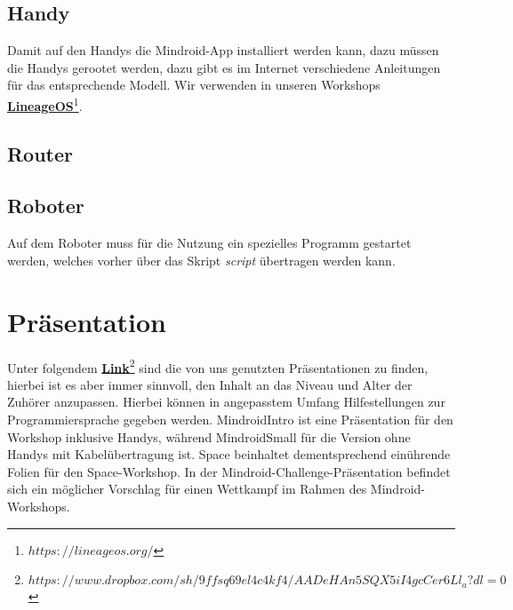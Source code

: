 \documentclass[
	ngerman,
	accentcolor=1c,%
	]{tudapub}
\begin{document}
\subsection{Handy}
Damit auf den Handys die Mindroid-App installiert werden kann, dazu m\"ussen die Handys gerootet werden, dazu gibt es im Internet verschiedene Anleitungen für das entsprechende Modell. Wir verwenden in unseren Workshops \href{https://lineageos.org/}{\textbf{LineageOS}\footnote{$https://lineageos.org/$}}.
\subsection{Router}

\subsection{Roboter}
Auf dem Roboter muss f\"ur die Nutzung ein spezielles Programm gestartet werden, welches vorher \"uber das Skript \textit{script} \"ubertragen werden kann.

\section{Pr\"asentation}
Unter folgendem \href{https://www.dropbox.com/sh/9ffsq69el4c4kf4/AADeHAn5SQX5iI4gcCer6Ll_a?dl=0}{\textbf{Link}\footnote{$https://www.dropbox.com/sh/9ffsq69el4c4kf4/AADeHAn5SQX5iI4gcCer6Ll_a?dl=0$}} 
sind die von uns genutzten Pr\"asentationen zu finden, hierbei ist es aber immer sinnvoll, den Inhalt an das Niveau und Alter der Zuh\"orer anzupassen. Hierbei k\"onnen in angepasstem Umfang Hilfestellungen zur Programmiersprache gegeben werden.\newline
MindroidIntro ist eine Pr\"asentation f\"ur den Workshop inklusive Handys, w\"ahrend MindroidSmall f\"ur die Version ohne Handys mit Kabel\"ubertragung ist. Space beinhaltet dementsprechend ein\"uhrende Folien f\"ur den Space-Workshop. In der Mindroid-Challenge-Pr\"asentation befindet sich ein m\"oglicher Vorschlag f\"ur einen Wettkampf im Rahmen des Mindroid-Workshops.



\cfoot{\textcolor{lightgray} \today}
\end{document}
